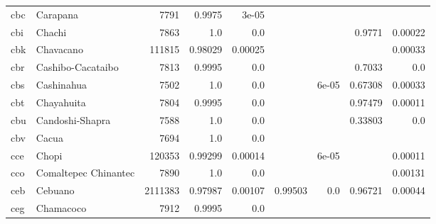\documentclass[11pt]{article}
\begin{document}
\begin{table*}[h]
{\begin{tabular}{llrrrrrrr}
cbc         & Carapana         & 7791         & 0.9975         & 3e-05         &          &          &          &          \\

cbi         & Chachi         & 7863         & 1.0         & 0.0         &          &          & 0.9771         & 0.00022         \\

cbk         & Chavacano         & 111815         & 0.98029         & 0.00025         &          &          &          & 0.00033         \\

cbr         & Cashibo-Cacataibo         & 7813         & 0.9995         & 0.0         &          &          & 0.7033         & 0.0         \\

cbs         & Cashinahua         & 7502         & 1.0         & 0.0         &          & 6e-05         & 0.67308         & 0.00033         \\

cbt         & Chayahuita         & 7804         & 0.9995         & 0.0         &          &          & 0.97479         & 0.00011         \\

cbu         & Candoshi-Shapra         & 7588         & 1.0         & 0.0         &          &          & 0.33803         & 0.0         \\

cbv         & Cacua         & 7694         & 1.0         & 0.0         &          &          &          &          \\

cce         & Chopi         & 120353         & 0.99299         & 0.00014         &          & 6e-05         &          & 0.00011         \\

cco         & Comaltepec Chinantec         & 7890         & 1.0         & 0.0         &          &          &          & 0.00131         \\

ceb         & Cebuano         & 2111383         & 0.97987         & 0.00107         & 0.99503         & 0.0         & 0.96721         & 0.00044         \\

ceg         & Chamacoco         & 7912         & 0.9995         & 0.0         &          &          &          &          \\


\end{tabular}}
\end{table*}
\end{document}
